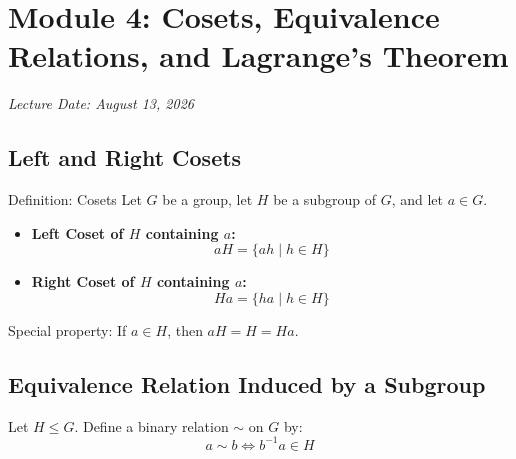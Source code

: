 \documentclass[11pt,a4paper]{article}
\begin{document}
\newpage

\section{Module 4: Cosets, Equivalence Relations, and Lagrange's Theorem}
\textit{Lecture Date: August 13, 2026}

\subsection{Left and Right Cosets}

\begin{defbox}{Definition: Cosets}
Let $G$ be a group, let $H$ be a subgroup of $G$, and let $a \in G$.
\begin{itemize}
    \item \textbf{Left Coset of $H$ containing $a$:}
    \begin{equation}
        aH = \{ ah \mid h \in H \}
    \end{equation}
    \item \textbf{Right Coset of $H$ containing $a$:}
    \begin{equation}
        Ha = \{ ha \mid h \in H \}
    \end{equation}
\end{itemize}
Special property: If $a \in H$, then $aH = H = Ha$.
\end{defbox}

\subsection{Equivalence Relation Induced by a Subgroup}

Let $H \le G$. Define a binary relation $\sim$ on $G$ by:
\begin{equation}
    a \sim b \iff b^{-1} a \in H
\end{equation}
\end{document}
